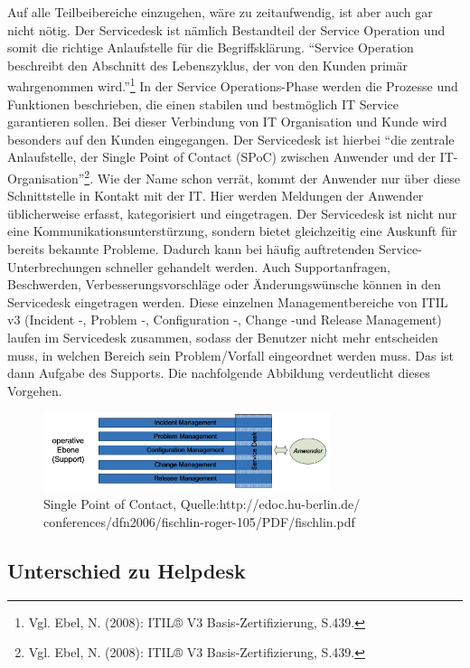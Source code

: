 \noindent
Auf alle Teilbeibereiche einzugehen, wäre zu zeitaufwendig, ist aber auch gar nicht nötig. Der Servicedesk ist nämlich Bestandteil der Service Operation und somit die richtige Anlaufstelle für die Begriffsklärung. \newline \enquote{Service Operation beschreibt den Abschnitt des Lebenszyklus, der von den Kunden primär wahrgenommen wird.}\footnote{Vgl. Ebel, N. (2008): ITIL® V3 Basis-Zertifizierung, S.439.} In der Service Operations-Phase werden die Prozesse und Funktionen beschrieben, die einen stabilen  und bestmöglich IT Service garantieren sollen. Bei dieser Verbindung von IT Organisation und Kunde wird besonders auf den Kunden eingegangen. Der Servicedesk ist hierbei \enquote{die zentrale Anlaufstelle, der Single Point of Contact (SPoC) zwischen Anwender und der IT-Organisation}\footnote{Vgl. Ebel, N. (2008): ITIL® V3 Basis-Zertifizierung, S.439.}. Wie der Name schon verrät, kommt der Anwender nur über diese Schnittstelle in Kontakt mit der IT. Hier werden Meldungen der Anwender üblicherweise erfasst, kategorisiert und eingetragen. Der Servicedesk ist nicht nur eine Kommunikationsunterstürzung, sondern bietet gleichzeitig eine Auskunft für bereits bekannte Probleme. Dadurch kann bei häufig auftretenden Service-Unterbrechungen schneller gehandelt werden. Auch Supportanfragen, Beschwerden, Verbesserungsvorschläge oder Änderungswünsche können in den Servicedesk eingetragen werden. Diese einzelnen Managementbereiche von ITIL v3 (Incident -, Problem -, Configuration -, Change -und Release Management) laufen im Servicedesk zusammen, sodass der Benutzer nicht mehr entscheiden muss, in welchen Bereich sein Problem/Vorfall eingeordnet werden muss. Das ist dann Aufgabe des Supports. Die nachfolgende Abbildung verdeutlicht dieses Vorgehen.

\begin{figure}[h!]
\centering
	\includegraphics[width=0.75\textwidth]{Abbildungen/SPOC_2.png}
	\caption[Single Point of Contact]{Single Point of Contact, Quelle:http://edoc.hu-berlin.de/
	conferences/dfn2006/fischlin-roger-105/PDF/fischlin.pdf}
	\label{fig:ITIL_Lebenyzyklus}
\end{figure}

\subsection{Unterschied zu Helpdesk}


